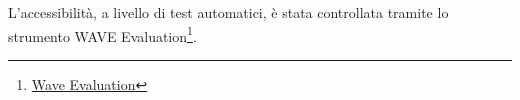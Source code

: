 L'accessibilità, a livello di test automatici, è stata controllata tramite lo strumento WAVE Evaluation\footnote{\href{https://wave.webaim.org/}{Wave Evaluation}}.\\